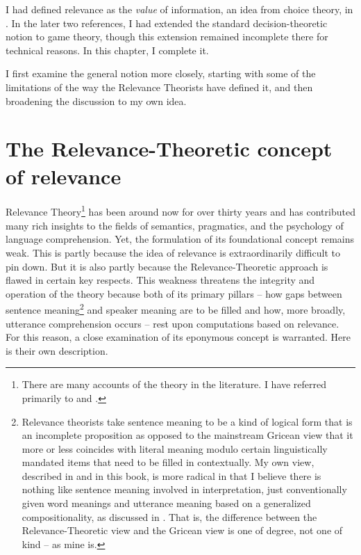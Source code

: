 I had defined relevance as the \emph{value} of information, an idea from choice theory, in \citet{parikh:gtai, parikh:rs, parikh:le}. In the later two references, I had extended the standard decision-theoretic notion to game theory, though this extension remained incomplete there for technical reasons. In this chapter, I complete it.

I first examine the general notion more closely, starting with some of the limitations of the way the Relevance Theorists have defined it, and then broadening the discussion to my own idea. 

%


\section{The Relevance-Theoretic concept of relevance} \label{sec:Relevance Theory}

Relevance Theory\footnote{There are many accounts of the theory in the literature. I have referred primarily to \citet{sw:r, sw:pmm} and \citet{sw:odr, sw:rt}.} has been around now for over thirty years and has contributed many rich insights to the fields of semantics, pragmatics, and the psychology of language comprehension. Yet, the formulation of its foundational concept remains weak. This is partly because the idea of relevance is extraordinarily difficult to pin down. But it is also partly because the Relevance-Theoretic approach  is flawed in certain key respects. This weakness threatens the integrity and operation of the theory because both of its primary pillars -- how gaps between sentence meaning\footnote{Relevance theorists take sentence meaning to be a kind of logical form that is an incomplete proposition as opposed to the mainstream Gricean view that it more or less coincides with literal meaning modulo certain linguistically mandated items that need to be filled in contextually. My own view, described in \citet{parikh:le} and in this book, is more radical in that I believe there is nothing like sentence meaning involved in interpretation, just conventionally given word meanings and utterance meaning based on a generalized compositionality, as discussed in . That is, the difference between the Relevance-Theoretic view and the Gricean view is one of degree, not one of kind -- as mine is.} and speaker meaning are to be filled and how, more broadly, utterance comprehension occurs -- rest upon computations based on relevance. For this reason, a close examination of its eponymous concept is warranted. Here is their own description.

